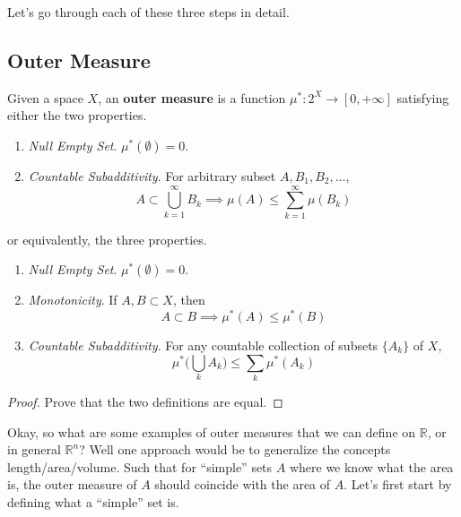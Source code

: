   Let's go through each of these three steps in detail. 

\subsection{Outer Measure} 

  \begin{definition}
    Given a space $X$, an \textbf{outer measure} is a function $\mu^\ast : 2^X \to [0, +\infty]$ satisfying either the two properties. 
    \begin{enumerate}
      \item \textit{Null Empty Set}. $\mu^\ast(\emptyset) = 0$. 
      \item \textit{Countable Subadditivity}. For arbitrary subset $A, B_1, B_2, \ldots$, 
      \begin{equation}
        A \subset \bigcup_{k=1}^\infty B_k \implies \mu(A) \leq \sum_{k=1}^\infty \mu(B_k)
      \end{equation} 
    \end{enumerate}

    or equivalently, the three properties. 
    \begin{enumerate}
      \item \textit{Null Empty Set}. $\mu^\ast(\emptyset) = 0$. 
      \item \textit{Monotonicity}. If $A, B \subset X$, then 
      \begin{equation}
        A \subset B \implies \mu^\ast (A) \leq \mu^\ast (B)
      \end{equation}
      \item \textit{Countable Subadditivity}. For any countable collection of subsets $\{A_k\}$ of $X$, 
      \begin{equation}
        \mu^\ast \bigg( \bigcup_k A_k \bigg) \leq \sum_{k} \mu^\ast (A_k) 
      \end{equation}
    \end{enumerate}
  \end{definition}
  \begin{proof}
    Prove that the two definitions are equal. 
  \end{proof} 

  Okay, so what are some examples of outer measures that we can define on $\mathbb{R}$, or in general $\mathbb{R}^n$? Well one approach would be to generalize the concepts length/area/volume. Such that for ``simple'' sets $A$ where we know what the area is, the outer measure of $A$ should coincide with the area of $A$. Let's first start by defining what a ``simple'' set is. 

